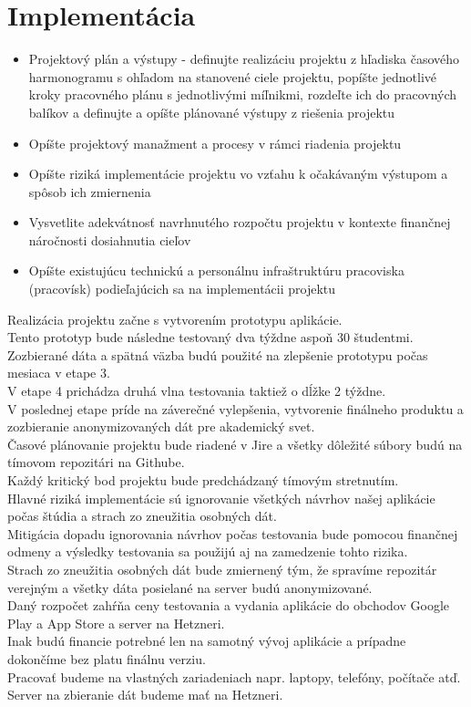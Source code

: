 \documentclass[10pt,slovak,a4paper]{article}
\begin{document}
\clearpage
\section{Implementácia}
\begin{itemize}
\item Projektový plán a výstupy - definujte realizáciu projektu z hľadiska časového
harmonogramu s ohľadom na stanovené ciele projektu, popíšte jednotlivé kroky
pracovného plánu s jednotlivými míľnikmi, rozdeľte ich do pracovných balíkov
a definujte a opíšte plánované výstupy z riešenia projektu
\item Opíšte projektový manažment a procesy v rámci riadenia projektu
\item Opíšte riziká implementácie projektu vo vzťahu k očakávaným výstupom a spôsob ich
zmiernenia
\item Vysvetlite adekvátnosť navrhnutého rozpočtu projektu v kontexte finančnej náročnosti
dosiahnutia cieľov
\item Opíšte existujúcu technickú a personálnu infraštruktúru pracoviska (pracovísk)
podieľajúcich sa na implementácii projektu

\end{itemize}
Realizácia projektu začne s vytvorením prototypu aplikácie. \\
Tento prototyp bude následne testovaný dva týždne aspoň 30 študentmi.  \\
Zozbierané dáta a spätná väzba budú použité na zlepšenie prototypu počas mesiaca v etape 3.  \\
V etape 4 prichádza druhá vlna testovania taktiež o dĺžke 2 týždne.  \\
V poslednej etape príde na záverečné vylepšenia, vytvorenie finálneho produktu a zozbieranie anonymizovaných dát pre akademický svet.  \\

Časové plánovanie projektu bude riadené v Jire a všetky dôležité súbory budú na tímovom repozitári na Githube.  \\
Každý kritický bod projektu bude predchádzaný tímovým stretnutím.  \\
Hlavné riziká implementácie sú ignorovanie všetkých návrhov našej aplikácie počas štúdia a strach zo zneužitia osobných dát.  \\
Mitigácia dopadu ignorovania návrhov počas testovania bude pomocou finančnej odmeny a výsledky testovania sa použijú aj na zamedzenie tohto rizika.  \\
Strach zo zneužitia osobných dát bude zmiernený tým, že spravíme repozitár verejným a všetky dáta posielané na server budú anonymizované.  \\

Daný rozpočet zahŕňa ceny testovania a vydania aplikácie do obchodov Google Play a App Store a server na Hetzneri.\\
Inak budú financie potrebné len na samotný vývoj aplikácie a prípadne dokončíme bez platu finálnu verziu.  \\

Pracovať budeme na vlastných zariadeniach napr. laptopy, telefóny, počítače atď. \\
Server na zbieranie dát budeme mať na Hetzneri.  \\
\end{document}

